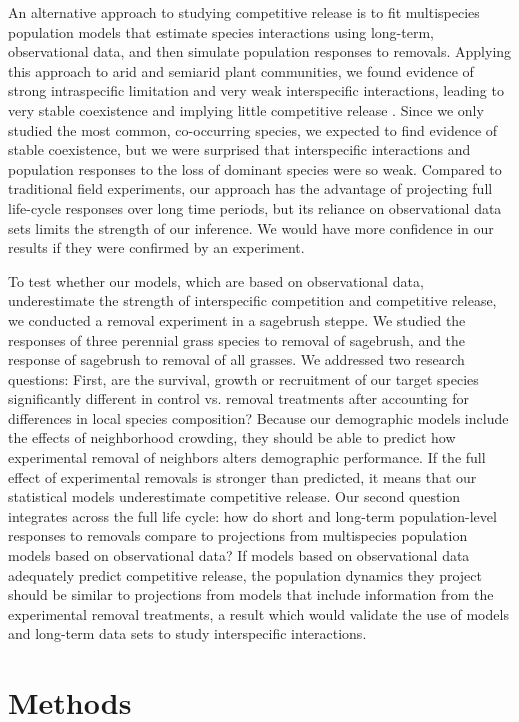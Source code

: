 \documentclass[11pt]{article}
\begin{document}
\begin{doublespacing}
An alternative approach to studying competitive release is to fit multispecies population models that estimate species interactions using long-term, observational data, and then simulate population responses to removals. Applying this approach to arid and semiarid plant communities, we found evidence of strong intraspecific limitation and very weak interspecific interactions, leading to very stable coexistence and implying little competitive release \citep{adler_coexistence_2010,chu_large_2015}. Since we only studied the most common, co-occurring species, we expected to find evidence of stable coexistence, but we were surprised that interspecific interactions and population responses to the loss of dominant species were so weak. Compared to traditional field experiments, our approach has the advantage of projecting full life-cycle responses over long time periods, but its reliance on observational data sets limits the strength of our inference. We would have more confidence in our results if they were confirmed by an experiment.

To test whether our models, which are based on observational data, underestimate the strength of interspecific competition and competitive release, we conducted a removal experiment in a sagebrush steppe. We studied the responses of three perennial grass species to removal of sagebrush, and the response of sagebrush to removal of all grasses. We addressed two research questions: First, are the survival, growth or recruitment of our target species significantly different in control vs. removal treatments after accounting for differences in local species composition? Because our demographic models include the effects of neighborhood crowding, they should be able to predict how experimental removal of neighbors alters demographic performance. If the full effect of experimental removals is stronger than predicted, it means that our statistical models underestimate competitive release.  Our second question integrates across the full life cycle: how do short and long-term population-level responses to removals compare to projections from multispecies population models based on observational data? If models based on observational data adequately predict competitive release, the population dynamics they project should be similar to projections from models that include information from the experimental removal treatments, a result which would validate the use of models and long-term data sets to study interspecific interactions. 

\section*{Methods}


\end{doublespacing}
\end{document}
